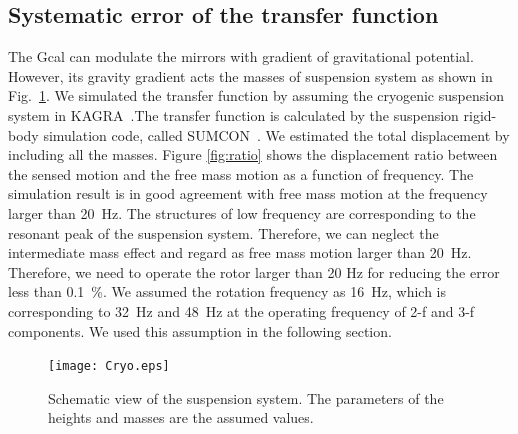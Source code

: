 \documentclass[%
 reprint,
superscriptaddress,
 amsmath,amssymb,
 aps,
]{revtex4-1}
\begin{document}
\subsection{Systematic error of the transfer function}
The Gcal can modulate the mirrors with gradient of gravitational potential. However, its gravity gradient acts the masses of suspension system as shown in Fig.~\ref{fig:cryo}. We simulated the transfer function by assuming the cryogenic suspension system in KAGRA~\cite{0264-9381-34-22-225001}.The transfer function is calculated by the suspension rigid-body simulation code, called SUMCON~\cite{SUMCON}. We estimated the total displacement by including all the masses. Figure \ref{fig:ratio} shows the displacement ratio between the sensed motion and the free mass motion as a function of frequency. The simulation result is in good agreement with free mass motion at the frequency larger than 20~Hz. The structures of low frequency are corresponding to the resonant peak of the suspension system. Therefore, we can neglect the intermediate mass effect and regard as free mass motion larger than 20~Hz. 
Therefore, we need to operate the rotor larger than 20 Hz for reducing the error less than 0.1~\%.
We assumed the rotation frequency as 16~Hz, which is corresponding to 32~Hz and 48~Hz at the operating frequency of 2-f and 3-f components.  We used this assumption in the following section.


\begin{figure}
\begin{center}
\texttt{[image: Cryo.eps]}
\caption{Schematic view of the suspension system. The parameters of the heights and masses are the assumed values. }
\label{fig:cryo}
\end{center}
\end{figure}
\end{document}
